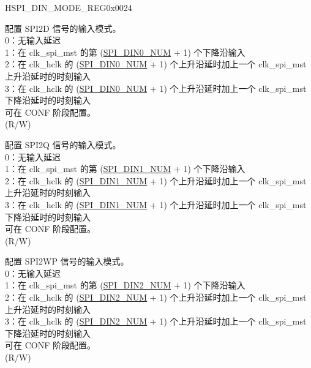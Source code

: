 \begin{register}{H}{SPI\_DIN\_MODE\_REG}{0x0024}\label{regdesc:SPIDINMODEREG}
%
%
%
%
%
%
%
%
%
%
\regnewline%
\begin{regdesc}\begin{reglist}
\label{fielddesc:SPIDIN0MODE}\item [SPI\_DIN0\_MODE] 配置 SPI2D 信号的输入模式。\\
0：无输入延迟\\
1：在 clk\_spi\_mst 的第 (\hyperref[fielddesc:SPIDIN0NUM]{SPI\_DIN0\_NUM} + 1) 个下降沿输入\\
2：在 clk\_hclk 的 (\hyperref[fielddesc:SPIDIN0NUM]{SPI\_DIN0\_NUM} + 1) 个上升沿延时加上一个 clk\_spi\_mst 上升沿延时的时刻输入\\
3：在 clk\_hclk 的 (\hyperref[fielddesc:SPIDIN0NUM]{SPI\_DIN0\_NUM} + 1) 个上升沿延时加上一个 clk\_spi\_mst 下降沿延时的时刻输入\\
可在 CONF 阶段配置。\\
(R/W)
\label{fielddesc:SPIDIN1MODE}\item [SPI\_DIN1\_MODE] 配置 SPI2Q 信号的输入模式。\\
0：无输入延迟\\
1：在 clk\_spi\_mst 的第 (\hyperref[fielddesc:SPIDIN1NUM]{SPI\_DIN1\_NUM} + 1) 个下降沿输入\\
2：在 clk\_hclk 的 (\hyperref[fielddesc:SPIDIN1NUM]{SPI\_DIN1\_NUM} + 1) 个上升沿延时加上一个 clk\_spi\_mst 上升沿延时的时刻输入\\
3：在 clk\_hclk 的 (\hyperref[fielddesc:SPIDIN1NUM]{SPI\_DIN1\_NUM} + 1) 个上升沿延时加上一个 clk\_spi\_mst 下降沿延时的时刻输入\\
可在 CONF 阶段配置。\\ 
(R/W)
\label{fielddesc:SPIDIN2MODE}\item [SPI\_DIN2\_MODE] 配置 SPI2WP 信号的输入模式。\\
0：无输入延迟\\
1：在 clk\_spi\_mst 的第 (\hyperref[fielddesc:SPIDIN2NUM]{SPI\_DIN2\_NUM} + 1) 个下降沿输入\\
2：在 clk\_hclk 的 (\hyperref[fielddesc:SPIDIN2NUM]{SPI\_DIN2\_NUM} + 1) 个上升沿延时加上一个 clk\_spi\_mst 上升沿延时的时刻输入\\
3：在 clk\_hclk 的 (\hyperref[fielddesc:SPIDIN2NUM]{SPI\_DIN2\_NUM} + 1) 个上升沿延时加上一个 clk\_spi\_mst 下降沿延时的时刻输入\\
可在 CONF 阶段配置。\\
(R/W)
\item [见下页]
\end{reglist}\end{regdesc}
\end{register}

